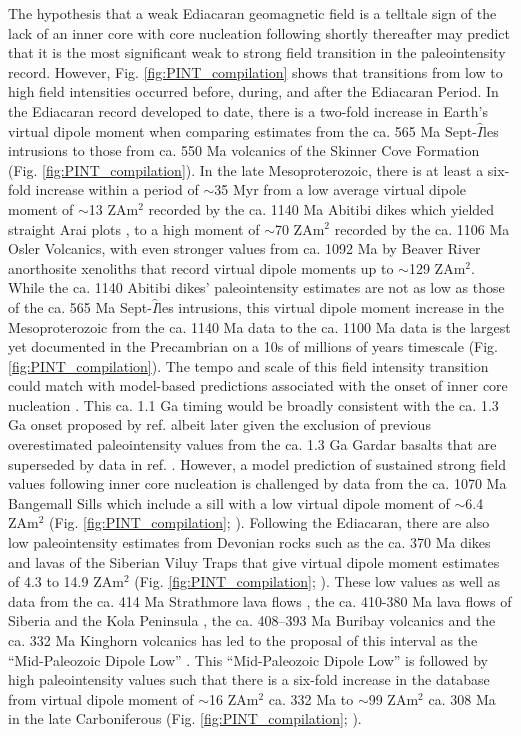 \documentclass[9pt,twocolumn,twoside,lineno]{pnas-new}
\begin{document}
The hypothesis that a weak Ediacaran geomagnetic field is a telltale sign of the lack of an inner core with core nucleation following shortly thereafter may predict that it is the most significant weak to strong field transition in the paleointensity record. However, Fig. \ref{fig:PINT_compilation} shows that transitions from low to high field intensities occurred before, during, and after the Ediacaran Period. In the Ediacaran record developed to date, there is a two-fold increase in Earth's virtual dipole moment when comparing estimates from the ca. 565 Ma Sept-$\hat{I}$les intrusions \cite{Bono2019a} to those from ca. 550 Ma volcanics of the Skinner Cove Formation \cite{Thallner2021a} (Fig. \ref{fig:PINT_compilation}). In the late Mesoproterozoic, there is at least a six-fold increase within a period of $\sim$35 Myr from a low average virtual dipole moment of $\sim$13 ZAm$^2$ recorded by the ca. 1140 Ma Abitibi dikes which yielded straight Arai plots \cite{Macouin2003a}, to a high moment of $\sim$70 ZAm$^2$ recorded by the ca. 1106 Ma Osler Volcanics, with even stronger values from ca. 1092 Ma by Beaver River anorthosite xenoliths that record virtual dipole moments up to $\sim$129 ZAm$^2$. While the ca. 1140 Abitibi dikes' paleointensity estimates are not as low as those of the ca. 565 Ma Sept-$\hat{I}$les intrusions, this virtual dipole moment increase in the Mesoproterozoic from the ca. 1140 Ma data to the ca. 1100 Ma data is the largest yet documented in the Precambrian on a 10s of millions of years timescale (Fig. \ref{fig:PINT_compilation}). The tempo and scale of this field intensity transition could match with model-based predictions associated with the onset of inner core nucleation \cite{Davies2021a}. This ca. 1.1 Ga timing would be broadly consistent with the ca. 1.3 Ga onset proposed by ref. \citealp{Biggin2015a} albeit later given the exclusion of previous overestimated paleointensity values from the ca. 1.3 Ga Gardar basalts that are superseded by data in ref. \citealp{Kodama2019a}. However, a model prediction of sustained strong field values following inner core nucleation is challenged by data from the ca. 1070 Ma Bangemall Sills which include a sill with a low virtual dipole moment of $\sim$6.4 ZAm$^2$ (Fig. \ref{fig:PINT_compilation};  \citealp{Lloyd2021b}). Following the Ediacaran, there are also low paleointensity estimates from Devonian rocks such as the ca. 370 Ma dikes and lavas of the Siberian Viluy Traps that give virtual dipole moment estimates of 4.3 to 14.9 ZAm$^2$ (Fig. \ref{fig:PINT_compilation}; \citealp{Hawkins2019a}). These low values as well as data from the ca. 414 Ma Strathmore lava flows \cite{Hawkins2021a}, the ca. 410-380 Ma lava flows of Siberia and the Kola Peninsula \cite{Shcherbakova2017a}, the ca. 408–393 Ma Buribay volcanics \cite{Shcherbakova2021a} and the ca. 332 Ma Kinghorn volcanics \cite{Hawkins2021a} has led to the proposal of this interval as the ``Mid-Paleozoic Dipole Low'' \cite{Hawkins2021a}. This ``Mid-Paleozoic Dipole Low'' is followed by high paleointensity values such that there is a six-fold increase in the database from virtual dipole moment of $\sim$16 ZAm$^2$ ca. 332 Ma to $\sim$99 ZAm$^2$ ca. 308 Ma in the late Carboniferous (Fig. \ref{fig:PINT_compilation}; \citealp{Hawkins2021a}). 
\end{document}
